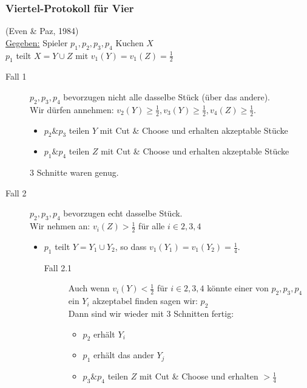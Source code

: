 \documentclass[a4paper,10pt]{scrartcl}
\begin{document}
\subsubsection*{Viertel-Protokoll für Vier}(Even \& Paz, 1984)\\
 \underline{Gegeben:} Spieler $p_1,p_2,p_3,p_4$ Kuchen $X$\\
 $p_1$ teilt $X=Y\cup Z$ mit $v_1(Y)=v_1(Z)=\frac{1}{2}$
 \begin{description}
  \item[Fall 1] $p_2,p_3,p_4$ bevorzugen nicht alle dasselbe Stück (über das andere).\\
                Wir dürfen annehmen: $v_2(Y)\geq\frac{1}{2},v_3(Y)\geq\frac{1}{2},v_4(Z)\geq\frac{1}{2}$.
                \begin{itemize}
                 \item $p_2\&p_3$ teilen $Y$ mit Cut \& Choose und erhalten akzeptable Stücke
                 \item $p_1\&p_4$ teilen $Z$ mit Cut \& Choose und erhalten akzeptable Stücke
                \end{itemize}
                3 Schnitte waren genug.
  \item[Fall 2] $p_2,p_3,p_4$ bevorzugen echt dasselbe Stück.\\
                Wir nehmen an: $v_i(Z)>\frac{1}{2}$ für alle $i\in{2,3,4}$
                \begin{itemize}
                 \item $p_1$ teilt $Y=Y_1\cup Y_2$, so dass $v_1(Y_1)=v_1(Y_2)=\frac{1}{4}$.
                       \begin{description}
                        \item[Fall 2.1] Auch wenn $v_i(Y)<\frac{1}{2}$ für $i\in{2,3,4}$ könnte einer von $p_2,p_3,p_4$ ein $Y_i$ akzeptabel
                                        finden sagen wir: $p_2$\\Dann sind wir wieder mit 3 Schnitten fertig:
                                        \begin{itemize}
                                         \item $p_2$ erhält $Y_i$
                                         \item $p_1$ erhält das ander $Y_j$
                                         \item $p_3\&p_4$ teilen $Z$ mit Cut \& Choose und erhalten $>\frac{1}{4}$
                                        \end{itemize}

\end{description}
\end{itemize}
\end{description}
\end{document}
